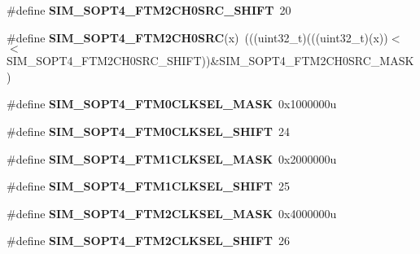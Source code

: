 \begin{DoxyCompactItemize}
\item 
\#define {\bfseries S\+I\+M\+\_\+\+S\+O\+P\+T4\+\_\+\+F\+T\+M2\+C\+H0\+S\+R\+C\+\_\+\+S\+H\+I\+FT}~20\hypertarget{group__SIM__Register__Masks_ga04d4aa6612f4d2df7d9e0e85f15f6dd6}{}\label{group__SIM__Register__Masks_ga04d4aa6612f4d2df7d9e0e85f15f6dd6}

\item 
\#define {\bfseries S\+I\+M\+\_\+\+S\+O\+P\+T4\+\_\+\+F\+T\+M2\+C\+H0\+S\+RC}(x)~(((uint32\+\_\+t)(((uint32\+\_\+t)(x))$<$$<$S\+I\+M\+\_\+\+S\+O\+P\+T4\+\_\+\+F\+T\+M2\+C\+H0\+S\+R\+C\+\_\+\+S\+H\+I\+FT))\&S\+I\+M\+\_\+\+S\+O\+P\+T4\+\_\+\+F\+T\+M2\+C\+H0\+S\+R\+C\+\_\+\+M\+A\+SK)\hypertarget{group__SIM__Register__Masks_ga6a8da66546e327289373ab1c101f0249}{}\label{group__SIM__Register__Masks_ga6a8da66546e327289373ab1c101f0249}

\item 
\#define {\bfseries S\+I\+M\+\_\+\+S\+O\+P\+T4\+\_\+\+F\+T\+M0\+C\+L\+K\+S\+E\+L\+\_\+\+M\+A\+SK}~0x1000000u\hypertarget{group__SIM__Register__Masks_gaac823c598ac790d9eeeeb7ddb86d1657}{}\label{group__SIM__Register__Masks_gaac823c598ac790d9eeeeb7ddb86d1657}

\item 
\#define {\bfseries S\+I\+M\+\_\+\+S\+O\+P\+T4\+\_\+\+F\+T\+M0\+C\+L\+K\+S\+E\+L\+\_\+\+S\+H\+I\+FT}~24\hypertarget{group__SIM__Register__Masks_ga77c42e9023c3ed2d759431e2c072860f}{}\label{group__SIM__Register__Masks_ga77c42e9023c3ed2d759431e2c072860f}

\item 
\#define {\bfseries S\+I\+M\+\_\+\+S\+O\+P\+T4\+\_\+\+F\+T\+M1\+C\+L\+K\+S\+E\+L\+\_\+\+M\+A\+SK}~0x2000000u\hypertarget{group__SIM__Register__Masks_ga0cd5cb92a9ea79e8227693c793ee5983}{}\label{group__SIM__Register__Masks_ga0cd5cb92a9ea79e8227693c793ee5983}

\item 
\#define {\bfseries S\+I\+M\+\_\+\+S\+O\+P\+T4\+\_\+\+F\+T\+M1\+C\+L\+K\+S\+E\+L\+\_\+\+S\+H\+I\+FT}~25\hypertarget{group__SIM__Register__Masks_ga04492b54a5b581b3bdef8568bdbabf91}{}\label{group__SIM__Register__Masks_ga04492b54a5b581b3bdef8568bdbabf91}

\item 
\#define {\bfseries S\+I\+M\+\_\+\+S\+O\+P\+T4\+\_\+\+F\+T\+M2\+C\+L\+K\+S\+E\+L\+\_\+\+M\+A\+SK}~0x4000000u\hypertarget{group__SIM__Register__Masks_ga8e9ace9af53ead470265ca2338402dae}{}\label{group__SIM__Register__Masks_ga8e9ace9af53ead470265ca2338402dae}

\item 
\#define {\bfseries S\+I\+M\+\_\+\+S\+O\+P\+T4\+\_\+\+F\+T\+M2\+C\+L\+K\+S\+E\+L\+\_\+\+S\+H\+I\+FT}~26\hypertarget{group__SIM__Register__Masks_ga4b5b8e4dc00734623d8a16db8ff0510c}{}\label{group__SIM__Register__Masks_ga4b5b8e4dc00734623d8a16db8ff0510c}


\end{DoxyCompactItemize}
